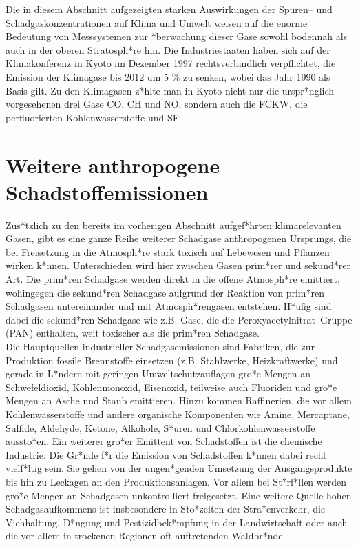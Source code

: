Die in diesem Abschnitt aufgezeigten starken Auswirkungen der
Spuren-- und Schadgaskonzentrationen auf Klima und Umwelt weisen
auf die enorme Bedeutung von Messsystemen zur *berwachung dieser
Gase sowohl bodennah als auch in der oberen Stratosph*re hin. Die
Industriestaaten haben sich auf der Klimakonferenz in Kyoto im
Dezember 1997 rechtsverbindlich verpflichtet, die Emission der
Klimagase bis 2012 um 5 \% zu senken, wobei das Jahr 1990 als
Basis gilt. Zu den Klimagasen z*hlte man in Kyoto nicht nur die
urspr*nglich vorgesehenen drei Gase CO, CH und
NO, sondern auch die FCKW, die perfluorierten
Kohlenwasserstoffe und SF.


\section{\label{anthropogene}Weitere anthropogene Schadstoffemissionen}

Zus*tzlich zu den bereits im vorherigen Abschnitt aufgef*hrten
klimarelevanten Gasen, gibt es eine ganze Reihe weiterer Schadgase
anthropogenen Ursprungs, die bei Freisetzung in die Atmosph*re
stark toxisch auf Lebewesen und Pflanzen wirken k*nnen.
Unterschieden wird hier zwischen Gasen prim*rer und sekund*rer
Art. Die prim*ren Schadgase werden direkt in die offene Atmosph*re
emittiert, wohingegen die sekund*ren Schadgase aufgrund der
Reaktion von prim*ren Schadgasen untereinander und mit
Atmosph*rengasen entstehen. H*ufig sind dabei die sekund*ren
Schadgase wie z.B. Gase, die die Peroxyacetylnitrat--Gruppe (PAN)
enthalten, weit toxischer als die prim*ren Schadgase.\\

Die Hauptquellen industrieller Schadgasemissionen sind Fabriken,
die zur Produktion fossile Brennstoffe einsetzen (z.B. Stahlwerke,
Heizkraftwerke) und gerade in L*ndern mit geringen
Umweltschutzauflagen gro*e Mengen an Schwefeldioxid,
Kohlenmonoxid, Eisenoxid, teilweise auch Fluoriden und gro*e
Mengen an Asche und Staub emittieren. Hinzu kommen Raffinerien,
die vor allem Kohlenwasserstoffe und andere organische Komponenten
wie Amine, Mercaptane, Sulfide, Aldehyde, Ketone, Alkohole, S*uren
und Chlorkohlenwasserstoffe aussto*en. Ein weiterer gro*er
Emittent von Schadstoffen ist die chemische Industrie. Die Gr*nde
f*r die Emission von Schadstoffen k*nnen dabei recht vielf*ltig
sein. Sie gehen von der ungen*genden Umsetzung der
Ausgangsprodukte bis hin zu Leckagen an den Produktionsanlagen.
Vor allem bei St*rf*llen werden gro*e Mengen an Schadgasen
unkontrolliert freigesetzt. Eine weitere Quelle hohen
Schadgasaufkommens ist insbesondere in Sto*zeiten der
Stra*enverkehr, die Viehhaltung, D*ngung und Pestizidbek*mpfung in
der Landwirtschaft oder auch die vor allem in trockenen Regionen
oft auftretenden Waldbr*nde.\\

